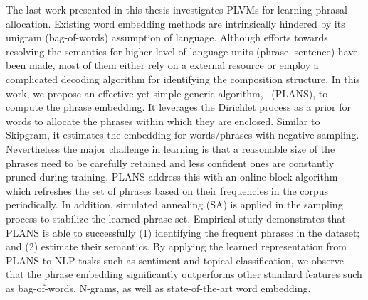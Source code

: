 The last work presented in this thesis investigates PLVMs for learning phrasal
allocation. Existing word embedding methods are intrinsically hindered by its
unigram (bag-of-words) assumption of language. Although efforts towards
resolving the semantics for higher level of language units (\eg phrase,
sentence) have been made, most of them either rely on a external resource or
employ a complicated decoding algorithm for identifying the composition
structure. In this work, we propose an effective yet simple generic algorithm,
\PLANS{}~(PLANS), to compute the phrase embedding. It leverages the Dirichlet
process as a prior for words to allocate the phrases within which they are
enclosed. Similar to Skipgram, it estimates the embedding for words/phrases with
negative sampling.  Nevertheless the major challenge in learning is that a
reasonable size of the phrases need to be carefully retained and less confident
ones are constantly pruned during training. PLANS address this with an online
block algorithm which refreshes the set of phrases based on their frequencies in
the corpus periodically. In addition, simulated annealing (SA) is applied in the
sampling process to stabilize the learned phrase set. Empirical study
demonstrates that PLANS is able to successfully (1) identifying the frequent
phrases in the dataset; and (2) estimate their semantics. By applying the
learned representation from PLANS to NLP tasks such as sentiment and topical
classification, we observe that the phrase embedding significantly outperforms
other standard features such as bag-of-words, N-grams, as well as
state-of-the-art word embedding.
